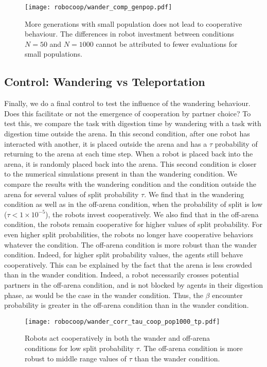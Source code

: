 \begin{figure}[tbhp]
    \begin{center}
        \texttt{[image: robocoop/wander\_comp\_genpop.pdf]}
        \vskip 0.25cm
        \caption{More generations with small population does not lead to cooperative behaviour. The differences in robot investment between conditions $N=50$ and $N=1000$ cannot be attributed to fewer evaluations for small populations.
        }
        \label{fig:gencomp}
    \end{center}
\end{figure}


\subsection{Control: Wandering vs Teleportation}


Finally, we do a final control to test the influence of the wandering behaviour. Does this facilitate or not the emergence of cooperation by partner choice? %
To test this, we compare the task with digestion time by wandering with a task with digestion time outside the arena. In this second condition, after one robot has interacted with another, it is placed outside the arena and has a $\tau$ probability of returning to the arena at each time step. When a robot is placed back into the arena, it is randomly placed back into the arena. This second condition is closer to the numerical simulations present in \citet{Debove2015c} than the wandering condition. We compare the results with the wandering condition and the condition outside the arena for several values of split probability $\tau$. %
We find that in the wandering condition as well as in the off-arena condition, when the probability of split is low ($\tau < 1\times 10^{-5}$), the robots invest cooperatively. We also find that in the off-arena condition, the robots remain cooperative for higher values of split probability. For even higher split probabilities, the robots no longer have cooperative behaviors whatever the condition. %
The off-arena condition is more robust than the wander condition. Indeed, for higher split probability values, the agents still behave cooperatively. This can be explained by the fact that the arena is less crowded than in the wander condition. Indeed, a robot necessarily crosses potential partners in the off-arena condition, and is not blocked by agents in their digestion phase, as would be the case in the wander condition. Thus, the $\beta$ encounter probability is greater in the off-arena condition than in the wander condition. %

\begin{figure}[tbhp]
    \begin{center}
        \texttt{[image: robocoop/wander\_corr\_tau\_coop\_pop1000\_tp.pdf]}
        \vskip 0.25cm
        \caption{Robots act cooperatively in both the wander and off-arena conditions for low split probability $\tau$. The off-arena condition is more robust to middle range values of $\tau$ than the wander condition.
        }
        \label{fig:comp_tau_wander_tp}
    \end{center}
\end{figure}

